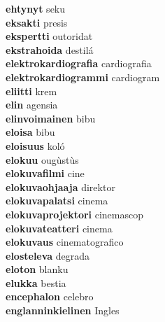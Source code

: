 \textbf{ehtynyt } seku \\
\textbf{eksakti } presis \\
\textbf{ekspertti } outoridat \\
\textbf{ekstrahoida } destilá \\
\textbf{elektrokardiografia } cardiografia \\
\textbf{elektrokardiogrammi } cardiogram \\
\textbf{eliitti } krem \\
\textbf{elin } agensia \\
\textbf{elinvoimainen } bibu \\
\textbf{eloisa } bibu \\
\textbf{eloisuus } koló \\
\textbf{elokuu } ougùstùs \\
\textbf{elokuvafilmi } cine \\
\textbf{elokuvaohjaaja } direktor \\
\textbf{elokuvapalatsi } cinema \\
\textbf{elokuvaprojektori } cinemascop \\
\textbf{elokuvateatteri } cinema \\
\textbf{elokuvaus } cinematografico \\
\textbf{elosteleva } degrada \\
\textbf{eloton } blanku \\
\textbf{elukka } bestia \\
\textbf{encephalon } celebro \\
\textbf{englanninkielinen } Ingles \\
